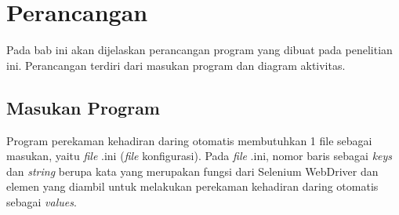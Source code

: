 \chapter{Perancangan}
\label{chap:perancangan}
Pada bab ini akan dijelaskan perancangan program yang dibuat pada penelitian ini. Perancangan terdiri dari masukan program dan diagram aktivitas. 

\section{Masukan Program}
\label{sec:inputConfig} 
Program perekaman kehadiran daring otomatis membutuhkan 1 file sebagai masukan, yaitu \textit{file} .ini (\textit{file} konfigurasi). Pada \textit{file} .ini, nomor baris sebagai \textit{keys} dan \textit{string} berupa kata yang merupakan fungsi dari Selenium WebDriver dan elemen yang diambil untuk melakukan perekaman kehadiran daring otomatis sebagai \textit{values}. 

